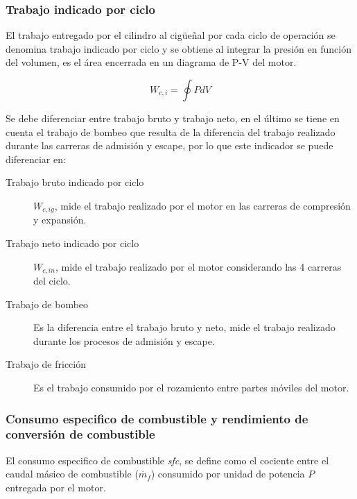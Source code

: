 
\subsubsection{Trabajo indicado por ciclo}
%
El trabajo entregado por el cilindro al cigüeñal por cada ciclo de operación
se denomina trabajo indicado por ciclo y se obtiene al integrar la presión
en función del volumen, es el área encerrada en un diagrama de P-V del motor.

\begin{equation}\label{eq:w_indicado} W_{c,i} = \oint P dV
\end{equation}

Se debe diferenciar entre trabajo bruto y trabajo neto, en el último se tiene en
cuenta el trabajo de bombeo que resulta de la diferencia del trabajo realizado
durante las carreras de admisión y escape, por lo que este indicador se puede
diferenciar en:
%
\begin{description}
  \item [Trabajo bruto indicado por ciclo] $W_{c,ig}$, mide el trabajo realizado
por el motor en las carreras de compresión y expansión.
  \item [Trabajo neto indicado por ciclo] $W_{c,in}$, mide el trabajo realizado
por el motor considerando las 4 carreras del ciclo.
  \item [Trabajo de bombeo] Es la diferencia entre el trabajo bruto y neto, mide
el trabajo realizado durante los procesos de admisión y escape.
  \item [Trabajo de fricción] Es el trabajo consumido por el rozamiento entre
partes móviles del motor.
\end{description}





\subsubsection{Consumo especifico de combustible y rendimiento de conversión de
combustible}
%
El consumo especifico de combustible \emph{sfc}, se define como el cociente
entre el caudal másico de combustible ($\dot{m_f}$) consumido por unidad de
potencia $P$ entregada por el motor.

